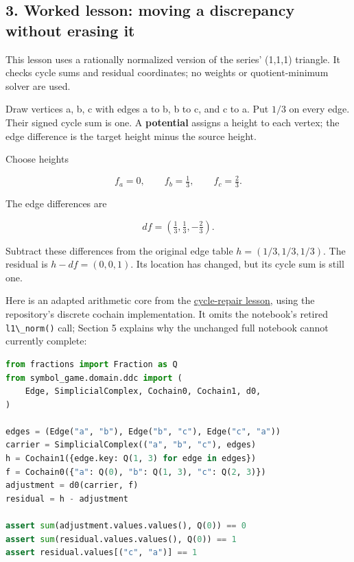 \documentclass[
  11pt,
]{article}
\newcommand{\passthrough}[1]{#1}
\begin{document}
\subsection{3. Worked lesson: moving a discrepancy without erasing
it}\label{worked-lesson-moving-a-discrepancy-without-erasing-it}

This lesson uses a rationally normalized version of the series' (1,1,1)
triangle. It checks cycle sums and residual coordinates; no weights or
quotient-minimum solver are used.

Draw vertices a, b, c with edges a to b, b to c, and c to a. Put \(1/3\)
on every edge. Their signed cycle sum is one. A \textbf{potential}
assigns a height to each vertex; the edge difference is the target
height minus the source height.

Choose heights

\[
f_a=0,\qquad f_b=\tfrac13,\qquad f_c=\tfrac23.
\]

The edge differences are

\[
df=(\tfrac13,\tfrac13,-\tfrac23).
\]

Subtract these differences from the original edge table
\(h=(1/3,1/3,1/3)\). The residual is \(h-df=(0,0,1)\). Its location has
changed, but its cycle sum is still one.

Here is an adapted arithmetic core from the
\href{https://github.com/dbccpage/the_symbol_game/blob/52cb5457f6c485ba548cfd292f6012a941ed22cf/education/the_symbol_game/lessons/system_integration/100_novices/04_cycle_repair.ipynb}{cycle-repair
lesson}, using the repository's discrete cochain implementation. It
omits the notebook's retired \passthrough{\lstinline!l1\_norm()!} call;
Section 5 explains why the unchanged full notebook cannot currently
complete:

\begin{lstlisting}[language=Python]
from fractions import Fraction as Q
from symbol_game.domain.ddc import (
    Edge, SimplicialComplex, Cochain0, Cochain1, d0,
)

edges = (Edge("a", "b"), Edge("b", "c"), Edge("c", "a"))
carrier = SimplicialComplex(("a", "b", "c"), edges)
h = Cochain1({edge.key: Q(1, 3) for edge in edges})
f = Cochain0({"a": Q(0), "b": Q(1, 3), "c": Q(2, 3)})
adjustment = d0(carrier, f)
residual = h - adjustment

assert sum(adjustment.values.values(), Q(0)) == 0
assert sum(residual.values.values(), Q(0)) == 1
assert residual.values[("c", "a")] == 1
\end{lstlisting}
\end{document}
